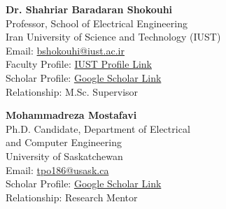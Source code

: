 \documentclass[10pt,a4paper]{article}
\begin{document}
	\begin{minipage}[t]{0.5\textwidth}
		\textbf{Dr. Shahriar Baradaran Shokouhi} \\
		Professor, School of Electrical Engineering \\
		Iran University of Science and Technology (IUST) \\
		Email: \href{mailto:bshokouhi@iust.ac.ir}{bshokouhi@iust.ac.ir} \\
		Faculty Profile: \href{https://its.iust.ac.ir/profile/en/bshokouhi}{IUST Profile Link} \\
		Scholar Profile: \href{https://scholar.google.com/citations?user=sMPEoRcAAAAJ&hl=en}{Google Scholar Link} \\
		Relationship: M.Sc. Supervisor
	\end{minipage}
	\begin{minipage}[t]{0.5\textwidth}
		\textbf{Mohammadreza Mostafavi} \\
		Ph.D. Candidate, Department of Electrical \\
		and Computer Engineering \\
		University of Saskatchewan \\
		Email: \href{mailto:tpo186@usask.ca}{tpo186@usask.ca} \\
		Scholar Profile: \href{https://scholar.google.com/citations?user=sMPEoRcAAAAJ&hl=en}{Google Scholar Link} \\
		Relationship: Research Mentor
	\end{minipage}%
	
\end{document}
